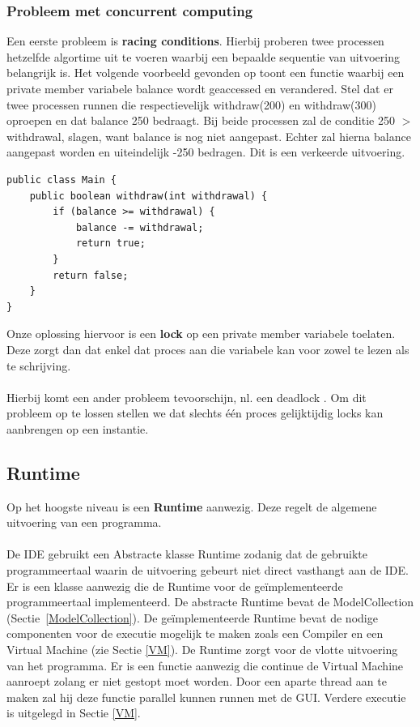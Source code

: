 \documentclass[]{article}
\begin{document}
\subsubsection{Probleem met concurrent computing}
Een eerste probleem is \textbf{racing conditions}. Hierbij proberen twee processen hetzelfde algortime uit te voeren waarbij een bepaalde sequentie van uitvoering belangrijk is. Het volgende voorbeeld gevonden op \cite{concurrent} toont een functie waarbij een private member variabele balance wordt geaccessed en verandered. Stel dat er twee processen runnen die respectievelijk withdraw(200) en withdraw(300) oproepen en dat balance 250 bedraagt. Bij beide processen zal de conditie 250 $>$ withdrawal, slagen, want balance is nog niet aangepast. Echter zal hierna balance aangepast worden en uiteindelijk -250 bedragen. Dit is een verkeerde uitvoering.
\lstset{language=Java}
\begin{lstlisting}
public class Main {
	public boolean withdraw(int withdrawal) {
    	if (balance >= withdrawal) {
        	balance -= withdrawal;
        	return true;
    	}	 
    	return false;
	}
}
\end{lstlisting}
Onze oplossing hiervoor is een \textbf{lock} op een private member variabele toelaten. Deze zorgt dan dat enkel dat proces aan die variabele kan voor zowel te lezen als te schrijving.\\\\
Hierbij komt een ander probleem tevoorschijn, nl. een deadlock \cite{deadlock}. Om dit probleem op te lossen stellen we dat slechts \'{e}\'{e}n proces gelijktijdig locks kan aanbrengen op een instantie.


\subsection{Runtime}
\label{Runtime}
Op het hoogste niveau is een \textbf{Runtime} aanwezig. Deze regelt de algemene uitvoering van een programma.
 \\\\De IDE gebruikt een Abstracte klasse Runtime zodanig dat de gebruikte programmeertaal waarin de uitvoering gebeurt niet direct vasthangt aan de IDE. Er is een klasse aanwezig die de Runtime voor de ge\"{i}mplementeerde programmeertaal implementeerd. De abstracte Runtime bevat  de ModelCollection (Sectie~\ref{ModelCollection}). De ge\"{i}mplementeerde Runtime bevat de nodige componenten voor de executie mogelijk te maken zoals een Compiler en een Virtual Machine (zie Sectie \ref{VM}). De Runtime zorgt voor de vlotte uitvoering van het programma. Er is een functie aanwezig die continue de Virtual Machine aanroept zolang er niet gestopt moet worden. Door een aparte thread aan te maken zal hij deze functie parallel kunnen runnen met de GUI. Verdere executie is uitgelegd in Sectie \ref{VM}.
\end{document}
